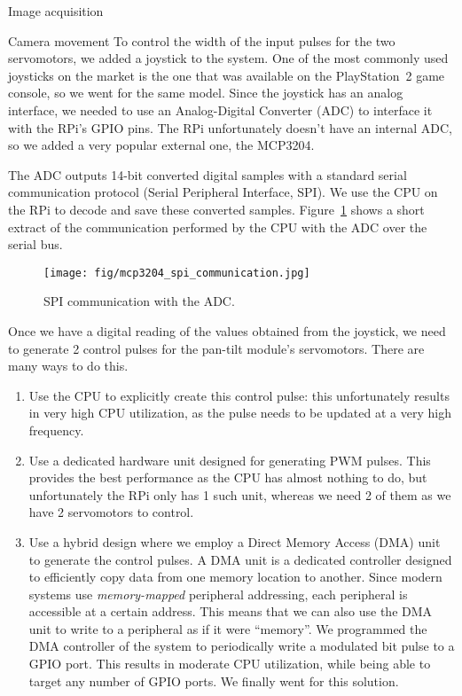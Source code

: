 \documentclass[11pt]{article}
\begin{document}
\begin{section}{Image acquisition}
\begin{subsubsection}{Camera movement}
        To control the width of the input pulses for the two servomotors, we added a joystick to the system. One of the most commonly used joysticks on the market is the one that was available on the PlayStation~2 game console, so we went for the same model. Since the joystick has an {analog} interface, we needed to use an Analog-Digital Converter (ADC) to interface it with the RPi's GPIO pins. The RPi unfortunately doesn't have an internal ADC, so we added a very popular external one, the MCP3204.

        \medskip

        The ADC outputs 14-bit converted digital samples with a standard serial communication protocol (Serial Peripheral Interface, SPI). We use the CPU on the RPi to decode and save these converted samples. Figure~\ref{fig:adc_spi_communication} shows a short extract of the communication performed by the CPU with the ADC over the serial bus.

        \begin{figure}[!h]
            \begin{center}
                \texttt{[image: fig/mcp3204\_spi\_communication.jpg]}
                \caption{SPI communication with the ADC.}
                \label{fig:adc_spi_communication}
            \end{center}
        \end{figure}

        \medskip

        Once we have a digital reading of the values obtained from the joystick, we need to generate 2 control pulses for the pan-tilt module's servomotors. There are many ways to do this.

        \begin{enumerate}
            \item Use the CPU to explicitly create this control pulse: this unfortunately results in very high CPU utilization, as the pulse needs to be updated at a very high frequency.
            \item Use a dedicated hardware unit designed for generating PWM pulses. This provides the best performance as the CPU has almost nothing to do, but unfortunately the RPi only has 1 such unit, whereas we need 2 of them as we have 2 servomotors to control.
            \item Use a hybrid design where we employ a Direct Memory Access (DMA) unit to generate the control pulses. A DMA unit is a dedicated controller designed to efficiently copy data from one memory location to another. Since modern systems use \emph{memory-mapped} peripheral addressing, each peripheral is accessible at a certain address. This means that we can also use the DMA unit to write to a peripheral as if it were ``memory''. We programmed the DMA controller of the system to periodically write a modulated bit pulse to a GPIO port. This results in moderate CPU utilization, while being able to target any number of GPIO ports. We finally went for this solution.
        \end{enumerate}


\end{subsubsection}
\end{section}
\end{document}
